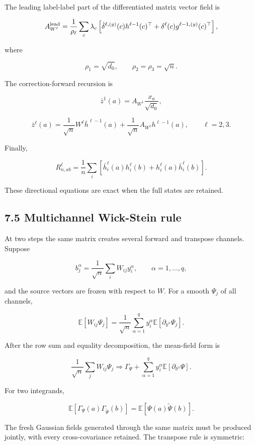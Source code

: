 The leading label-label part of the differentiated matrix vector field is

\[
A_{W^\ell}^{\rm lead}
=
\frac1{\rho_\ell}\sum_c\lambda_c
\left[
\dot\delta^{\ell,(y)}(c)h^{\ell-1}(c)^\top
+\delta^\ell(c)g^{\ell-1,(y)}(c)^\top
\right],
\]


where

\[
\rho_1=\sqrt{d_0},
\qquad
\rho_2=\rho_3=\sqrt n.
\]


The correction-forward recursion is

\[
\bar z^1(a)=A_{W^1}\frac{x_a}{\sqrt{d_0}},
\]


\[
\bar z^\ell(a)
=
\frac1{\sqrt n}W^\ell\bar h^{\ell-1}(a)
+\frac1{\sqrt n}A_{W^\ell}h^{\ell-1}(a),
\qquad \ell=2,3.
\]


Finally,

\[
\boxed{
R^\ell_{n,ab}
=
\frac1n\sum_i
\left[
\bar h_i^\ell(a)h_i^\ell(b)
+h_i^\ell(a)\bar h_i^\ell(b)
\right].
}
\]


These directional equations are exact when the full states are retained.

\subsection*{7.5 Multichannel Wick-Stein rule}


At two steps the same matrix creates several forward and transpose channels.
Suppose

\[
b_j^\alpha
=
\frac1{\sqrt n}\sum_iW_{ij}y_i^\alpha,
\qquad
\alpha=1,\ldots,q,
\]


and the source vectors are frozen with respect to \(W\). For a smooth
\(\Psi_j\) of all channels,

\[
\mathbb E[W_{ij}\Psi_j]
=
\frac1{\sqrt n}\sum_{\alpha=1}^q
y_i^\alpha
\mathbb E[\partial_{b^\alpha}\Psi_j].
\]


After the row sum and equality decomposition, the mean-field form is

\[
\boxed{
\frac1{\sqrt n}\sum_jW_{ij}\Psi_j
\Longrightarrow
\Gamma_\Psi
+\sum_{\alpha=1}^q
y_i^\alpha\mathbb E[\partial_{b^\alpha}\Psi].
}
\]


For two integrands,

\[
\mathbb E[\Gamma_\Psi(a)\Gamma_{\widetilde\Psi}(b)]
=
\mathbb E[\Psi(a)\widetilde\Psi(b)].
\]


The fresh Gaussian fields generated through the same matrix must be produced
jointly, with every cross-covariance retained. The transpose rule is
symmetric:

